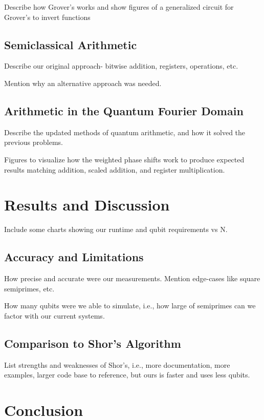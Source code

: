 \documentclass[twocolumn]{cinc}
\begin{document}
  Describe how Grover's works and show figures of a generalized
  circuit for Grover's to invert functions

  \subsection{Semiclassical Arithmetic} 

  Describe our original approach- bitwise addition, registers, operations, etc.

  Mention why an alternative approach was needed.

  \subsection{Arithmetic in the Quantum Fourier Domain}  

  Describe the updated methods of quantum arithmetic, and how it solved the 
  previous problems.

  Figures to visualize how the weighted phase shifts work to produce
  expected results matching addition, scaled addition, and register 
  multiplication.

\section{Results and Discussion}

Include some charts showing our runtime and qubit requirements vs N.

  \subsection{Accuracy and Limitations}

  How precise and accurate were our measurements. Mention edge-cases like
  square semiprimes, etc.

  How many qubits were we able to simulate, i.e., how large of semiprimes
  can we factor with our current systems.

  \subsection{Comparison to Shor's Algorithm}

  List strengths and weaknesses of Shor's, i.e., more documentation, more
  examples, larger code base to reference, but ours is faster and uses less
  qubits.

\section{Conclusion}
\end{document}
